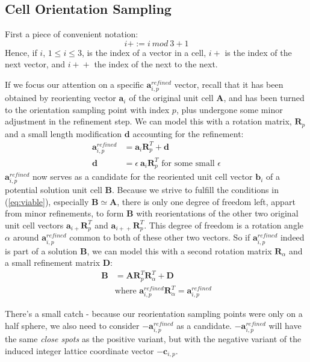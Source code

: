 \documentclass[a4paper,10pt]{article}
\newcommand{\vect}[1]{\mathbf{#1}}
\newcommand{\mat}[1]{\mathbf{#1}}
\begin{document}
\subsection{Cell Orientation Sampling}\label{subsec:cellsampling}

First a piece of convenient notation:
%
\[
 i+ := i\:mod\:3 + 1
\]
%
Hence, if $i$, $1\leq i\leq 3$, is the index of a vector in a cell, $i+$ is the index of the next vector, and ${i+}+$ the index of the next to the next.

If we focus our attention on a specific $\vect{a}_{i,p}^{refined}$ vector, recall that it has been obtained by reorienting vector $\vect{a}_i$ of the original unit cell $\mat{A}$, and has been turned to the orientation sampling point with index $p$, plus undergone some minor adjustment in the refinement step. We can model this with a rotation matrix, $\mat{R}_p$ and a small length modification $\vect{d}$ accounting for the refinement:
%
\[
 \begin{split}
  \vect{a}_{i,p}^{refined} &= \vect{a}_i \mat{R}_p^T + \vect{d} \\
  \vect{d} &= \epsilon\:\vect{a}_i \mat{R}_p^T \text{ for some small }\epsilon
 \end{split}
\]
%
$\vect{a}_{i,p}^{refined}$ now serves as a candidate for the reoriented unit cell vector $\vect{b}_i$ of a potential solution unit cell $\mat{B}$. Because we strive to fulfill the conditions in (\ref{eq:viable}), especially $\mat{B}\simeq \mat{A}$, there is only one degree of freedom left, appart from minor refinements, to form $\mat{B}$ with reorientations of the other two original unit cell vectors $\vect{a}_{i+} \mat{R}_p^T$ and $\vect{a}_{{i+}+} \mat{R}_p^T$. This degree of freedom is a rotation angle $\alpha$ around $\vect{a}_{i,p}^{refined}$ common to both of these other two vectors. So if $\vect{a}_{i,p}^{refined}$ indeed is part of a solution $\mat{B}$, we can model this with a second rotation matrix $\mat{R}_\alpha$ and a small refinement matrix $\mat{D}$:
%
\[
 \begin{split}
  \mat{B} &= \mat{A} \mat{R}_p^T \mat{R}_\alpha^T + \mat{D} \\
  &\text{where }\vect{a}_{i,p}^{refined}\mat{R}_\alpha^T = \vect{a}_{i,p}^{refined}
 \end{split}
\]

There's a small catch - because our reorientation sampling points were only on a half sphere, we also need to consider $-\vect{a}_{i,p}^{refined}$ as a candidate. $-\vect{a}_{i,p}^{refined}$ will have the same \emph{close spots} as the positive variant, but with the negative variant of the induced integer lattice coordinate vector $-\vect{c}_{i,p}$.
\end{document}
